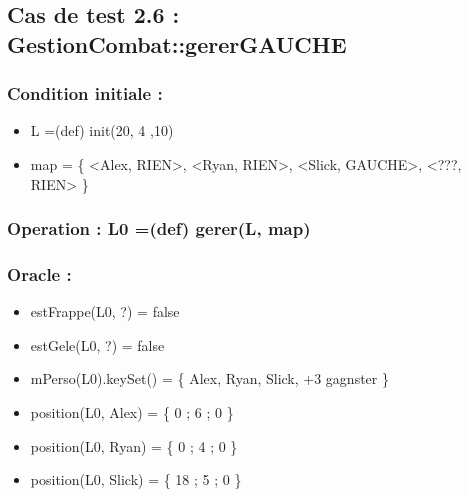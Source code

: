 \documentclass[11pt]{article}
\begin{document}
\subsection{Cas de test 2.6 : GestionCombat::gererGAUCHE}
\label{sec-1.7}

\subsubsection{Condition initiale :}
\label{sec-1.7.1}

\begin{itemize}

\item L =(def) init(20, 4 ,10)\\
\label{sec-1.7.1.1}


\item map = \{ <Alex, RIEN>, <Ryan, RIEN>, <Slick, GAUCHE>, <???, RIEN> \}\\
\label{sec-1.7.1.2}

\end{itemize} %
\subsubsection{Operation : L0 =(def) gerer(L, map)}
\label{sec-1.7.2}

\subsubsection{Oracle :}
\label{sec-1.7.3}

\begin{itemize}

\item estFrappe(L0, ?) = false\\
\label{sec-1.7.3.1}


\item estGele(L0, ?) = false\\
\label{sec-1.7.3.2}


\item mPerso(L0).keySet() = \{ Alex, Ryan, Slick, +3 gagnster \}\\
\label{sec-1.7.3.3}


\item position(L0, Alex) = \{ 0 ; 6 ; 0 \}\\
\label{sec-1.7.3.4}


\item position(L0, Ryan) = \{ 0 ; 4 ; 0 \}\\
\label{sec-1.7.3.5}


\item position(L0, Slick) = \{ 18 ; 5 ; 0 \}\\
\label{sec-1.7.3.6}


\end{itemize} %
\end{document}
